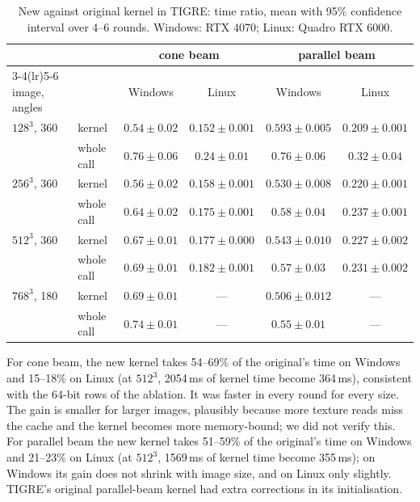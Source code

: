 \documentclass[11pt,a4paper]{article}
\theoremstyle{remark}
\begin{document}
\begin{table}[h]
\centering
\caption{\label{tab:bench}New against original kernel in TIGRE: time ratio, mean with 95\% confidence
interval over 4--6 rounds. Windows: RTX 4070; Linux: Quadro RTX 6000.}
\small\setlength{\tabcolsep}{4pt}
\begin{tabular}{llcccc}
\toprule
& & \multicolumn{2}{c}{cone beam} & \multicolumn{2}{c}{parallel beam}\\
\cmidrule(lr){3-4}\cmidrule(lr){5-6}
image, angles & & Windows & Linux & Windows & Linux\\
\midrule
$128^3$, 360 & kernel     & $0.54\pm0.02$ & $0.152\pm0.001$ & $0.593\pm0.005$ & $0.209\pm0.001$\\
             & whole call & $0.76\pm0.06$ & $0.24\pm0.01$   & $0.76\pm0.06$   & $0.32\pm0.04$\\
$256^3$, 360 & kernel     & $0.56\pm0.02$ & $0.158\pm0.001$ & $0.530\pm0.008$ & $0.220\pm0.001$\\
             & whole call & $0.64\pm0.02$ & $0.175\pm0.001$ & $0.58\pm0.04$   & $0.237\pm0.001$\\
$512^3$, 360 & kernel     & $0.67\pm0.01$ & $0.177\pm0.000$ & $0.543\pm0.010$ & $0.227\pm0.002$\\
             & whole call & $0.69\pm0.01$ & $0.182\pm0.001$ & $0.57\pm0.03$   & $0.231\pm0.002$\\
$768^3$, 180 & kernel     & $0.69\pm0.01$ & ---             & $0.506\pm0.012$ & ---\\
             & whole call & $0.74\pm0.01$ & ---             & $0.55\pm0.01$   & ---\\
\bottomrule
\end{tabular}
\end{table}

For cone beam, the new kernel takes 54--69\% of the original's time on Windows and 15--18\% on Linux (at
$512^3$, 2054\,ms of kernel time become 364\,ms), consistent with the 64-bit rows of the ablation. It was
faster in every round for every size. The gain is smaller for larger images, plausibly because more texture
reads miss the cache and the kernel becomes more memory-bound; we did not verify this. For parallel beam the
new kernel takes 51--59\% of the original's time on Windows and 21--23\% on Linux (at $512^3$, 1569\,ms of
kernel time become 355\,ms); on Windows its gain does not shrink with image size, and on Linux only slightly.
TIGRE's original parallel-beam kernel had extra corrections in its initialisation.
\end{document}
